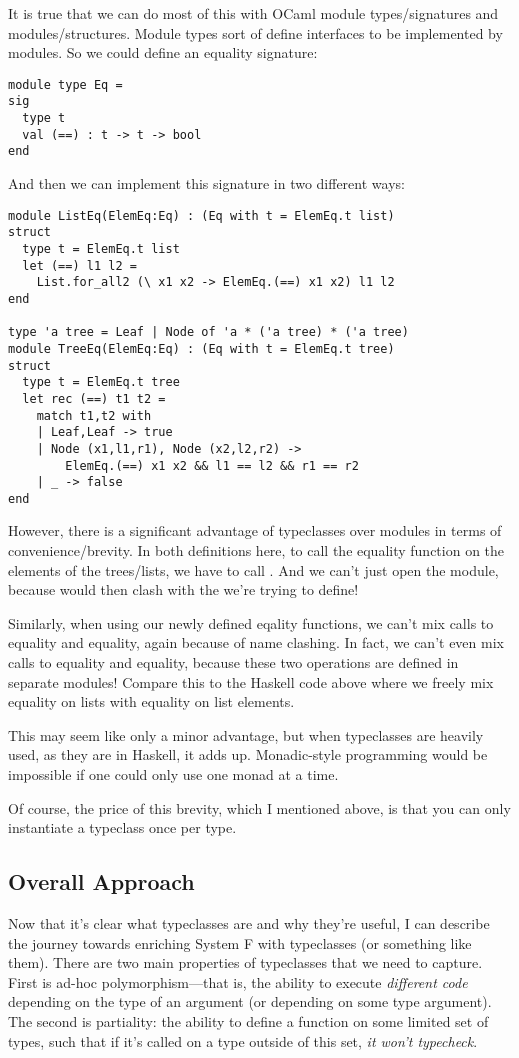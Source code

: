 \message{ !name(report.tex)}\documentclass[pageno]{jpaper}
\begin{document}
{{{It is true that we can do most of this with OCaml module types/signatures and modules/structures. Module types sort of define interfaces to be implemented by modules. So we could define an equality signature:

\begin{lstlisting}
module type Eq = 
sig
  type t
  val (==) : t -> t -> bool
end
\end{lstlisting}

And then we can implement this signature in two different ways:

\begin{lstlisting}
module ListEq(ElemEq:Eq) : (Eq with t = ElemEq.t list)
struct
  type t = ElemEq.t list
  let (==) l1 l2 =
    List.for_all2 (\ x1 x2 -> ElemEq.(==) x1 x2) l1 l2
end

type 'a tree = Leaf | Node of 'a * ('a tree) * ('a tree)
module TreeEq(ElemEq:Eq) : (Eq with t = ElemEq.t tree)
struct
  type t = ElemEq.t tree
  let rec (==) t1 t2 =
    match t1,t2 with
    | Leaf,Leaf -> true
    | Node (x1,l1,r1), Node (x2,l2,r2) ->
        ElemEq.(==) x1 x2 && l1 == l2 && r1 == r2
    | _ -> false
end

\end{lstlisting}

However, there is a significant advantage of typeclasses over modules in terms of convenience/brevity.
In both definitions here, to call the equality function on the elements of the trees/lists,
we have to call . And we can't just open the  module, because
 would then clash with the \lsti{==} we're trying to define!

Similarly, when using our newly defined eqality functions, we can't mix calls to  equality
and  equality, again because of name clashing. In fact, we can't even mix calls to
 equality and  equality, because these two operations are defined in
separate modules! Compare this to the Haskell code above where we freely mix equality on lists with
equality on list elements.

This may seem like only a minor advantage, but when typeclasses are heavily used, as they are in Haskell, it adds up. Monadic-style programming would be impossible if one could only use one monad at a time.

Of course, the price of this brevity, which I mentioned above, is that you can only instantiate a typeclass
once per type.

\subsection{Overall Approach}
Now that it's clear what typeclasses are and why they're useful, I can describe the journey towards enriching System F with typeclasses (or something like them). There are two main properties
of typeclasses that we need to capture. First is ad-hoc polymorphism---that is, the ability to execute \textit{different code} depending on the type of an argument (or depending on some type argument).
The second is partiality: the ability to define a function on some limited set of types, such that if it's called on a type outside of this set, \textit{it won't typecheck}.

}}}
\end{document}
